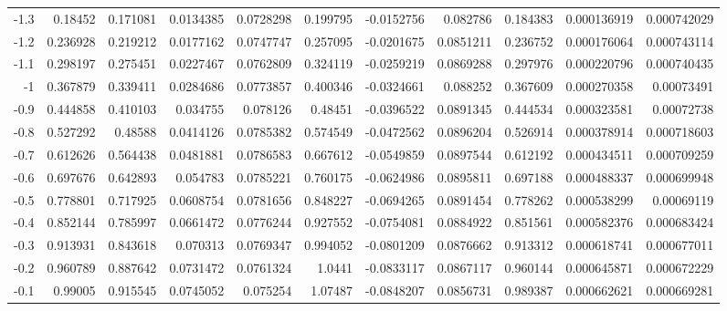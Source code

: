{\begin{tabular}{rrrrrrrrrrr}
 -1.3         & 0.18452    & 0.171081   &   0.0134385   &     0.0728298 & 0.199795   &  -0.0152756   &     0.082786  & 0.184383   &   0.000136919 &   0.000742029 \\
 -1.2         & 0.236928   & 0.219212   &   0.0177162   &     0.0747747 & 0.257095   &  -0.0201675   &     0.0851211 & 0.236752   &   0.000176064 &   0.000743114 \\
 -1.1         & 0.298197   & 0.275451   &   0.0227467   &     0.0762809 & 0.324119   &  -0.0259219   &     0.0869288 & 0.297976   &   0.000220796 &   0.000740435 \\
 -1           & 0.367879   & 0.339411   &   0.0284686   &     0.0773857 & 0.400346   &  -0.0324661   &     0.088252  & 0.367609   &   0.000270358 &   0.00073491  \\
 -0.9         & 0.444858   & 0.410103   &   0.034755    &     0.078126  & 0.48451    &  -0.0396522   &     0.0891345 & 0.444534   &   0.000323581 &   0.00072738  \\
 -0.8         & 0.527292   & 0.48588    &   0.0414126   &     0.0785382 & 0.574549   &  -0.0472562   &     0.0896204 & 0.526914   &   0.000378914 &   0.000718603 \\
 -0.7         & 0.612626   & 0.564438   &   0.0481881   &     0.0786583 & 0.667612   &  -0.0549859   &     0.0897544 & 0.612192   &   0.000434511 &   0.000709259 \\
 -0.6         & 0.697676   & 0.642893   &   0.054783    &     0.0785221 & 0.760175   &  -0.0624986   &     0.0895811 & 0.697188   &   0.000488337 &   0.000699948 \\
 -0.5         & 0.778801   & 0.717925   &   0.0608754   &     0.0781656 & 0.848227   &  -0.0694265   &     0.0891454 & 0.778262   &   0.000538299 &   0.00069119  \\
 -0.4         & 0.852144   & 0.785997   &   0.0661472   &     0.0776244 & 0.927552   &  -0.0754081   &     0.0884922 & 0.851561   &   0.000582376 &   0.000683424 \\
 -0.3         & 0.913931   & 0.843618   &   0.070313    &     0.0769347 & 0.994052   &  -0.0801209   &     0.0876662 & 0.913312   &   0.000618741 &   0.000677011 \\
 -0.2         & 0.960789   & 0.887642   &   0.0731472   &     0.0761324 & 1.0441     &  -0.0833117   &     0.0867117 & 0.960144   &   0.000645871 &   0.000672229 \\
 -0.1         & 0.99005    & 0.915545   &   0.0745052   &     0.075254  & 1.07487    &  -0.0848207   &     0.0856731 & 0.989387   &   0.000662621 &   0.000669281 \\

\end{tabular}}
